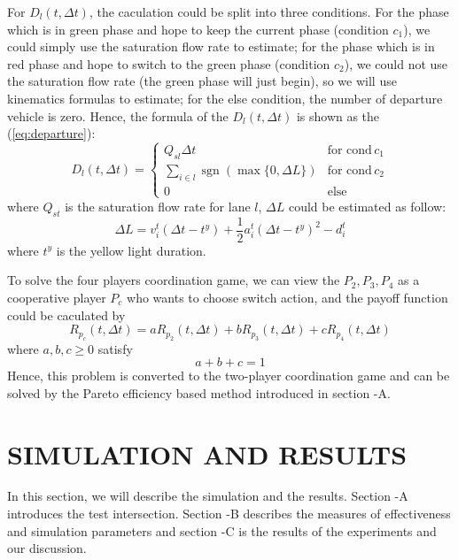 \documentclass[a4paper, 10pt, conference]{ieeeconf}      %
\DeclareMathOperator*{\sgn}{sgn}
\begin{document}
For $D_l(t,\Delta t)$, the caculation could be split into three conditions. For the phase which is in green phase and hope to keep the current
phase (condition $c_1$), we could simply use the saturation flow rate to estimate; for the phase which is in red phase and hope to switch to the 
green phase (condition $c_2$), we could not use the saturation flow rate (the green phase will just begin), so we will use kinematics formulas
to estimate; for the else condition, the number of departure vehicle is zero. Hence, the formula of the $D_l(t,\Delta t)$ is shown as 
the (\ref{eq:departure}):
\begin{equation}
        \label{eq:departure}
        D_l(t,\Delta t)=\begin{cases}
                Q_{sl}\Delta t&\text{for cond}\, c_1\\
                \sum_{i\in l}\sgn(\max\{0,\Delta L\})&\text{for cond}\, c_2\\
                0&\text{else}
        \end{cases}
\end{equation}
where $Q_{st}$ is the saturation flow rate for lane $l$, $\Delta L$ could be estimated as follow:
\begin{equation}
        \Delta L=v_i^t(\Delta t-t^y)+\frac{1}{2}a_i^t(\Delta t-t^y)^2-d_i^t
\end{equation}
where $t^y$ is the yellow light duration. 

To solve the four players coordination game, we can view the $P_2,P_3,P_4$ as a cooperative player $P_c$ who wants to choose switch action, and 
the payoff function could be caculated by 
\begin{equation}
        R_{p_c}(t,\Delta t)=aR_{p_2}(t,\Delta t)+bR_{p_3}(t,\Delta t)+cR_{p_4}(t,\Delta t)
\end{equation}
where $a,b,c\ge 0$ satisfy
\begin{equation}
        a+b+c=1
\end{equation}
Hence, this problem is converted to the two-player coordination game and can be solved by the Pareto efficiency based method introduced 
in section \uppercase\expandafter{}-A.

\section{SIMULATION AND RESULTS}

In this section, we will describe the simulation and the results. Section \uppercase\expandafter{}-A introduces the 
test intersection. Section \uppercase\expandafter{}-B describes the measures of effectiveness and simulation parameters and 
section \uppercase\expandafter{}-C is the results of the experiments and our discussion.
\end{document}

